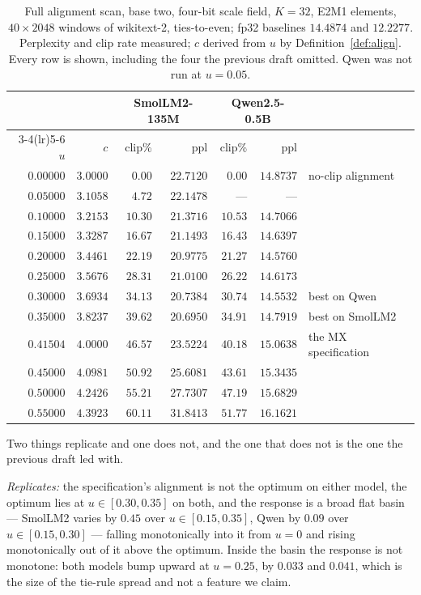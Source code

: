 \documentclass[11pt]{article}
\theoremstyle{definition}
\begin{document}
\begin{table}[t]\centering
\caption{Full alignment scan, base two, four-bit scale field, $K=32$, E2M1
elements, $40\times2048$ windows of wikitext-2, ties-to-even; fp32 baselines
$14.4874$ and $12.2277$. Perplexity and clip rate measured; $c$ derived from $u$
by Definition~\ref{def:align}. Every row is shown, including the four the
previous draft omitted. Qwen was not run at $u=0.05$.}
\label{tab:uscan}
\begin{tabular}{rrrrrrl}
\toprule
 & & \multicolumn{2}{c}{SmolLM2-135M} & \multicolumn{2}{c}{Qwen2.5-0.5B} & \\
\cmidrule(lr){3-4}\cmidrule(lr){5-6}
$u$ & $c$ & clip\% & ppl & clip\% & ppl & \\
\midrule
$0.00000$ & $3.0000$ & $0.00$  & $22.7120$ & $0.00$  & $14.8737$ & no-clip alignment \\
$0.05000$ & $3.1058$ & $4.72$  & $22.1478$ & ---     & ---       & \\
$0.10000$ & $3.2153$ & $10.30$ & $21.3716$ & $10.53$ & $14.7066$ & \\
$0.15000$ & $3.3287$ & $16.67$ & $21.1493$ & $16.43$ & $14.6397$ & \\
$0.20000$ & $3.4461$ & $22.19$ & $20.9775$ & $21.27$ & $14.5760$ & \\
$0.25000$ & $3.5676$ & $28.31$ & $21.0100$ & $26.22$ & $14.6173$ & \\
$0.30000$ & $3.6934$ & $34.13$ & $20.7384$ & $30.74$ & $\mathbf{14.5532}$ & best on Qwen \\
$0.35000$ & $3.8237$ & $39.62$ & $\mathbf{20.6950}$ & $34.91$ & $14.7919$ & best on SmolLM2 \\
$0.41504$ & $4.0000$ & $46.57$ & $23.5224$ & $40.18$ & $15.0638$ & the MX specification~\cite{ocpmx} \\
$0.45000$ & $4.0981$ & $50.92$ & $25.6081$ & $43.61$ & $15.3435$ & \\
$0.50000$ & $4.2426$ & $55.21$ & $27.7307$ & $47.19$ & $15.6829$ & \\
$0.55000$ & $4.3923$ & $60.11$ & $31.8413$ & $51.77$ & $16.1621$ & \\
\bottomrule
\end{tabular}
\end{table}

Two things replicate and one does not, and the one that does not is the one the
previous draft led with.

\emph{Replicates:} the specification's alignment is not the optimum on either
model, the optimum lies at $u\in[0.30,0.35]$ on both, and the response is a
broad flat basin --- SmolLM2 varies by $0.45$ over $u\in[0.15,0.35]$, Qwen by
$0.09$ over $u\in[0.15,0.30]$ --- falling monotonically into it from $u=0$ and
rising monotonically out of it above the optimum. Inside the basin the response
is not monotone: both models bump upward at $u=0.25$, by $0.033$ and $0.041$,
which is the size of the tie-rule spread and not a feature we claim.
\end{document}
